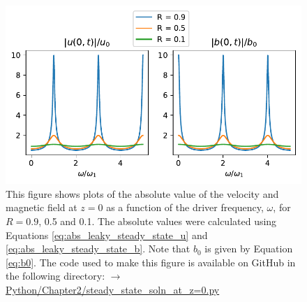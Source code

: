 \begin{figure}
    \centering
    \vspace{-20pt}
    \includegraphics[width=\textwidth,height=0.9\textheight,keepaspectratio]{figures/chapter02/steady_state_soln_at_z=0.pdf}
    \vspace{-30pt}
    \caption{This figure shows plots of the absolute value of the velocity and magnetic field at $z=0$ as a function of the driver frequency, $\omega$, for $R=0.9$, 0.5 and 0.1. The absolute values were calculated using Equations \eqref{eq:abs_leaky_steady_state_u} and \eqref{eq:abs_leaky_steady_state_b}. Note that $b_0$ is given by Equation \eqref{eq:b0}. The code used to make this figure is available on GitHub in the following directory:\newline
    \href{https://github.com/aleksyprok/apkp_thesis/blob/main/Python/Chapter2/steady_state_soln_at_z\%3D0.py}{$\rightarrow$ Python/Chapter2/steady\_state\_soln\_at\_z=0.py}}
    \vspace{-10pt}
    \label{fig:steady_state_soln_at_z=0}
\end{figure}

